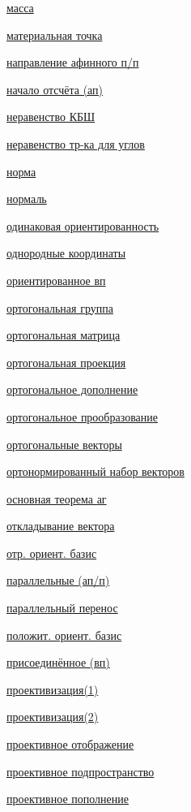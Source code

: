 \documentclass[a4paper,100pt]{article}
\theoremstyle{indented}
\theoremstyle{definition}
\theoremstyle{remark}
\begin{document}
\begin{multicols}{2}
    \hyperlink{s11}{масса} \ 
    
    \hyperlink{s10}{материальная точка} \ 
    
    \hyperlink{s14}{направление афинного п/п} \ 
    
    \hyperlink{s5}{начало отсчёта (ап)} \ 

    \hyperlink{s57}{неравенство КБШ} \ 

    \hyperlink{s60}{неравенство тр-ка для углов} \ 

    \hyperlink{s55}{норма} \ 

    \hyperlink{s69}{нормаль} \ 

    \hyperlink{s78}{одинаковая ориентированность} \ 
    
    \hyperlink{s36}{однородные координаты} \ 

    \hyperlink{s79}{ориентированное вп} \ 

    \hyperlink{s74}{ортогональная группа} \ 

    \hyperlink{s75}{ортогональная матрица} \ 

    \hyperlink{s68}{ортогональная проекция} \ 

    \hyperlink{s67}{ортогональное дополнение} \ 

    \hyperlink{s73}{ортогональное прообразование} \ 

    \hyperlink{s61}{ортогональные векторы} \ 

    \hyperlink{s63}{ортонормированный набор векторов} \ 
    
    \hyperlink{s31}{основная теорема аг} \ 
    
    \hyperlink{s4}{откладывание вектора} \ 

    \hyperlink{s81}{отр. ориент. базис} \ 
    
    \hyperlink{s17}{параллельные (ап/п)} \ 
    
    \hyperlink{s16}{параллельный перенос} \ 

    \hyperlink{s80}{положит. ориент. базис} \ 
    
    \hyperlink{s3}{присоединённое (вп)} \ 
    
    \hyperlink{s33}{проективизация(1)} \
    
    \hyperlink{s42}{проективизация(2)} \ 

    \hyperlink{s43}{проективное отображение} \ 
    
    \hyperlink{s35}{проективное подпространство} \ 
    
    \hyperlink{s37}{проективное пополнение} \ 
    

\end{multicols}
\end{document}
